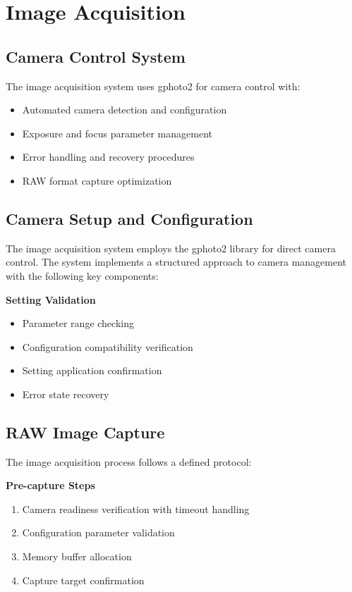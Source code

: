\section{Image Acquisition}
\subsection{Camera Control System}
The image acquisition system uses gphoto2 for camera control with:
\begin{itemize}
    \item Automated camera detection and configuration
    \item Exposure and focus parameter management
    \item Error handling and recovery procedures
    \item RAW format capture optimization
\end{itemize}

\subsection{Camera Setup and Configuration}
The image acquisition system employs the gphoto2 library for direct camera control. The system implements a structured approach to camera management with the following key components:

\textbf{Setting Validation}
\begin{itemize}
    \item Parameter range checking
    \item Configuration compatibility verification
    \item Setting application confirmation
    \item Error state recovery
\end{itemize}

\subsection{RAW Image Capture}
The image acquisition process follows a defined protocol:

\textbf{Pre-capture Steps}
\begin{enumerate}
    \item Camera readiness verification with timeout handling
    \item Configuration parameter validation
    \item Memory buffer allocation
    \item Capture target confirmation
\end{enumerate}


